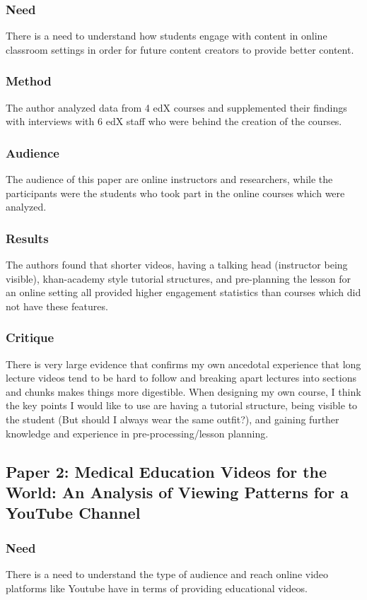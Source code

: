 \documentclass[
	letterpaper, %
]{jdf}
\begin{document}
\subsubsection{Need}
There is a need to understand how students engage with content in online classroom settings in order for future content creators to provide better content.
\subsubsection{Method}
The author analyzed data from 4 edX courses and supplemented their findings with interviews with 6 edX staff who were behind the creation of the courses.
\subsubsection{Audience}
The audience of this paper are online instructors and researchers, while the participants were the students who took part in the online courses which were analyzed.
\subsubsection{Results}
The authors found that shorter videos, having a talking head (instructor being visible), khan-academy style tutorial structures, and pre-planning the lesson for an online setting all provided higher engagement statistics than courses which did not have these features. 
\subsubsection{Critique}
There is very large evidence that confirms my own ancedotal experience that long lecture videos tend to be hard to follow and breaking apart lectures into sections and chunks makes things more digestible. When designing my own course, I think the key points I would like to use are having a tutorial structure, being visible to the student (But should I always wear the same outfit?), and gaining further knowledge and experience in pre-processing/lesson planning.

\subsection{Paper 2: Medical Education Videos for the World: An Analysis of Viewing Patterns for a YouTube Channel \citep{tackett1}}
\subsubsection{Need}
There is a need to understand the type of audience and reach online video platforms like Youtube have in terms of providing educational videos.
\end{document}
